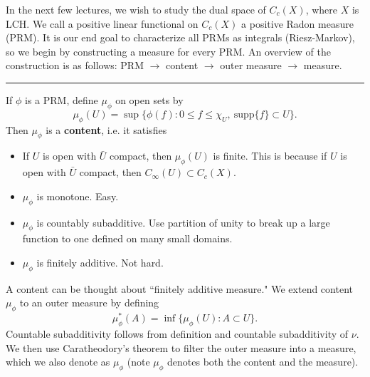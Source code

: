 \documentclass[12pt, letterpaper]{article}
\renewcommand{\i}{\infty}
\begin{document}
\pagestyle{fancy}
In the next few lectures, we wish to study the dual space of $C_c(X)$, where $X$ is LCH. We call a positive linear functional on $C_c(X)$ a positive Radon measure (PRM). It is our end goal to characterize all PRMs as integrals (Riesz-Markov), so we begin by constructing a measure for every PRM. An overview of the construction is as follows: PRM $ \rightarrow $ content $ \rightarrow $ outer measure $ \rightarrow $ measure.

\noindent\rule{\textwidth}{1pt}

If $\phi$ is a PRM, define $\mu_\phi$ on open sets by
\[
    \mu_\phi(U) = \sup \{ \phi(f): 0 \leq f \leq \chi_U, \ \text{supp}\{f\} \subset U\}.
\]
Then $\mu_\phi$ is a \textbf{content}, i.e. it satisfies
\begin{itemize}
    \item If $U$ is open with $\bar{U}$ compact, then $\mu_\phi(U)$ is finite. This is because if $U$ is open with $\bar{U}$ compact, then $C_\i(U) \subset C_c(X)$.
    \item $\mu_\phi$ is monotone. Easy.
    \item $\mu_\phi$ is countably subadditive. Use partition of unity to break up a large function to one defined on many small domains.
    \item $\mu_\phi$ is finitely additive. Not hard.
\end{itemize}
A content can be thought about ``finitely additive measure." We extend content $\mu_\phi$ to an outer measure by defining
\[
    \mu_\phi^*(A) = \inf\{\mu_\phi(U): A \subset U\}.
\]
Countable subadditivity follows from definition and countable subadditivity of $\nu$. We then use Caratheodory's theorem to filter the outer measure into a measure, which we also denote as $\mu_\phi$ (note $\mu_\phi$ denotes both the content and the measure).
\end{document}
